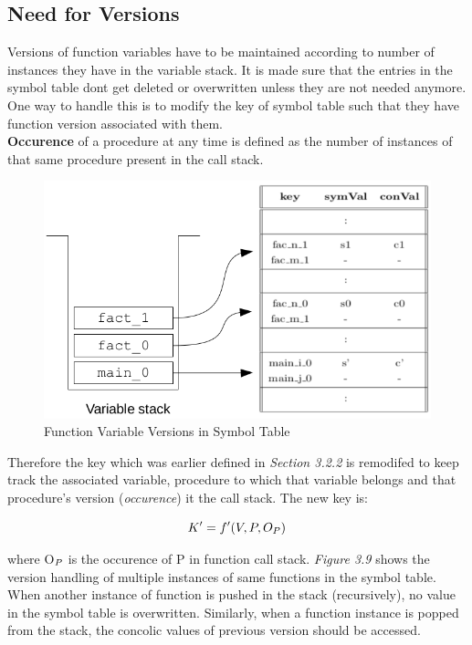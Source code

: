 \documentclass[12pt,oneside]{book}
\begin{document}
\subsection{Need for Versions}
Versions of function variables have to be maintained according to number of instances they have in the variable stack. It is made sure that the entries in the symbol table dont get deleted or overwritten unless they are not needed anymore. One way to handle this is to modify the key of symbol table such that they have function version associated with them. \\
\textbf{Occurence} of a procedure at any time is defined as the number of instances of that same procedure present in the call stack.\\

\vspace{0.4cm}
\begin{figure}[htbp]
\centering
\includegraphics[scale=0.50]{symtableandstack.png}
\caption{Function Variable Versions in Symbol Table}
\end{figure}
Therefore the key which was earlier defined in \textit{Section 3.2.2} is remodifed to keep track the associated variable, procedure to which that variable belongs and that procedure's version (\textit{occurence}) it the call stack. The new key is:

\begin{equation}
K' = f'(V,P,O_{\tiny{P}})
\end{equation}

where O$_{\tiny{P}}$ is the occurence of P in function call stack.
\textit{Figure 3.9} shows the version handling of multiple instances of same functions in the symbol table. When another instance of function is pushed in the stack (recursively), no value in the symbol table is overwritten. Similarly, when a function instance is popped from the stack, the concolic values of previous version should be accessed.
\end{document}
